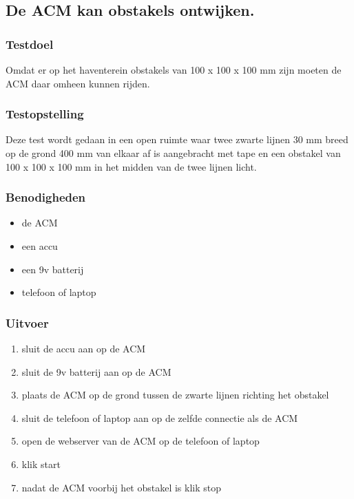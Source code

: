 \subsection{De ACM kan obstakels ontwijken.}
\subsubsection{Testdoel}
\begin{flushleft}
    Omdat er op het haventerein obstakels van 100 x 100 x 100 mm zijn moeten de ACM daar omheen kunnen rijden.
\end{flushleft}
\subsubsection{Testopstelling}
\begin{flushleft}
    Deze test wordt gedaan in een open ruimte waar twee zwarte lijnen 30 mm breed op de grond 400 mm van elkaar af is aangebracht met tape en een obstakel van 100 x 100 x 100 mm in het midden van de twee lijnen licht.
\end{flushleft}
\subsubsection{Benodigheden}

\begin{itemize}
    \item de ACM
    \item een accu
    \item een 9v batterij
    \item telefoon of laptop
\end{itemize}
\subsubsection{Uitvoer}
\begin{enumerate}
    \item sluit de accu aan op de ACM
    \item sluit de 9v batterij aan op de ACM
    \item plaats de ACM op de grond tussen de zwarte lijnen richting het obstakel
    \item sluit de telefoon of laptop aan op de zelfde connectie als de ACM
    \item open de webserver van de ACM op de telefoon of laptop
    \item klik start
    \item nadat de ACM voorbij het obstakel is klik stop
\end{enumerate}
